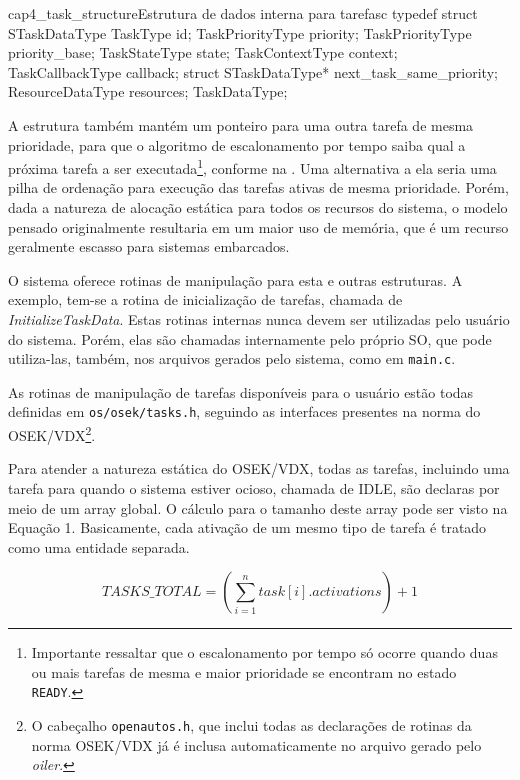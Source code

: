 \begin{algoritmo}{cap4_task_structure}{Estrutura de dados interna para tarefas}{c}
typedef struct STaskDataType {
	TaskType id;
	TaskPriorityType priority;
	TaskPriorityType priority_base;
	TaskStateType state;
	TaskContextType context;
	TaskCallbackType callback;
	struct STaskDataType* next_task_same_priority;
	ResourceDataType resources;
} TaskDataType;
\end{algoritmo}

A estrutura também mantém um ponteiro para uma outra tarefa de mesma prioridade, para que o algoritmo de escalonamento por tempo saiba qual a próxima tarefa a ser executada\footnote{Importante ressaltar que o escalonamento por tempo só ocorre quando duas ou mais tarefas de mesma e maior prioridade se encontram no estado \texttt{READY}.}, conforme na . Uma alternativa a ela seria uma pilha de ordenação para execução das tarefas ativas de mesma prioridade. Porém, dada a natureza de alocação estática para todos os recursos do sistema, o modelo pensado originalmente resultaria em um maior uso de memória, que é um recurso geralmente escasso para sistemas embarcados.


O sistema oferece rotinas de manipulação para esta e outras estruturas. A exemplo, tem-se a rotina de inicialização de tarefas, chamada de \emph{InitializeTaskData}. Estas rotinas internas nunca devem ser utilizadas pelo usuário do sistema. Porém, elas são chamadas internamente pelo próprio SO, que pode utiliza-las, também, nos arquivos gerados pelo sistema, como em \texttt{main.c}.

As rotinas de manipulação de tarefas disponíveis para o usuário estão todas definidas em \texttt{os/osek/tasks.h}, seguindo as interfaces presentes na norma do OSEK/VDX\footnote{O cabeçalho \texttt{openautos.h}, que inclui todas as declarações de rotinas da norma OSEK/VDX já é inclusa automaticamente no arquivo gerado pelo \emph{oiler}.}.

Para atender a natureza estática do OSEK/VDX, todas as tarefas, incluindo uma tarefa para quando o sistema estiver ocioso, chamada de IDLE, são declaras por meio de um array global. O cálculo para o tamanho deste array pode ser visto na Equação 1. Basicamente, cada ativação de um mesmo tipo de tarefa é tratado como uma entidade separada.

\begin{equacao}[!ht]
	\label{equ:cap4_tasks_total}
	\caption{Cálculo do total de tarefas do sistema.}
	\begin{equation*}
	TASKS\_TOTAL = (\sum\limits_{i=1}^{n} task[i].activations) + 1
	\end{equation*}
\end{equacao}

